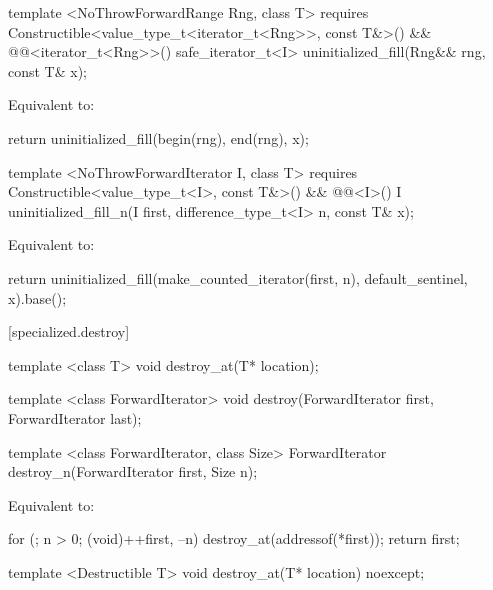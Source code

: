 {\color{addclr}
\begin{codeblock}
template <NoThrowForwardRange Rng, class T>
  requires Constructible<value_type_t<iterator_t<Rng>>, const T&>() &&
            @@<iterator_t<Rng>>()
  safe_iterator_t<I>
  uninitialized_fill(Rng&& rng, const T& x);
\end{codeblock}

\setcounter{Paras}{0}
\pnum
\effects Equivalent to:
\begin{codeblock}
        return uninitialized_fill(begin(rng), end(rng), x);
\end{codeblock}

\begin{codeblock}
template <NoThrowForwardIterator I, class T>
  requires Constructible<value_type_t<I>, const T&>() &&
           @@<I>()
  I uninitialized_fill_n(I first, difference_type_t<I> n, const T& x);
\end{codeblock}

\pnum
\effects Equivalent to:
\begin{codeblock}
        return uninitialized_fill(make_counted_iterator(first, n),
                                  default_sentinel{}, x).base();
\end{codeblock}
} %

[specialized.destroy]{}
{\color{remclr}
\begin{codeblock}
template <class T>
  void destroy_at(T* location);
\end{codeblock}

\begin{codeblock}
template <class ForwardIterator>
  void destroy(ForwardIterator first, ForwardIterator last);
\end{codeblock}

\begin{codeblock}
template <class ForwardIterator, class Size>
  ForwardIterator destroy_n(ForwardIterator first, Size n);
\end{codeblock}

\setcounter{Paras}{2}
\pnum
\effects Equivalent to:
\begin{codeblock}
        for (; n > 0; (void)++first, --n)
          destroy_at(addressof(*first));
        return first;
\end{codeblock}
} %

{\color{addclr}
\begin{codeblock}
template <Destructible T>
  void destroy_at(T* location) noexcept;
\end{codeblock}
} %

